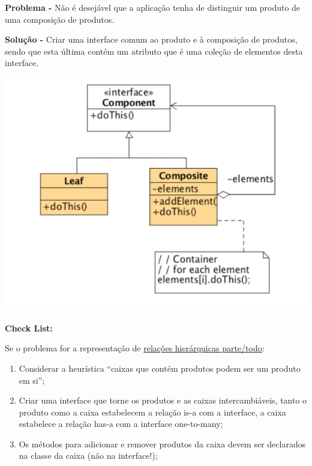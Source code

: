 \documentclass{article}
\begin{document}
\begin{flushleft}
    \textbf{Problema -} Não é desejável que a aplicação tenha de distinguir um produto de uma composição
    de produtos.
\end{flushleft}

\begin{flushleft}
    \textbf{Solução -} Criar uma interface comum ao produto e à composição de produtos, sendo que esta
    última contém um atributo que é uma coleção de elementos desta interface.

    \begin{center}
        \includegraphics[scale=0.3]{Images/45.png}
    \end{center}
\end{flushleft}

\pagebreak

\begin{flushleft}
    \textbf{Check List:}

    \vspace{3mm}
    Se o problema for a representação de \uline{relações hierárquicas parte/todo}:
    \begin{enumerate}
        \item Considerar a heurística “caixas que contém produtos podem ser um produto
        em si”;
        \item Criar uma interface que torne os produtos e as caixas intercambiáveis,
        tanto o produto como a caixa estabelecem a relação is-a com a interface,
        a caixa estabelece a relação has-a com a interface one-to-many;
        \item Os métodos para adicionar e remover produtos da caixa devem ser
        declarados na classe da caixa (não na interface!);
    \end{enumerate}
\end{flushleft}
\end{document}
